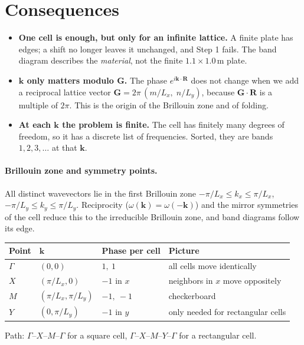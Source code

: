 \section{Consequences}

\begin{itemize}
  \item \textbf{One cell is enough, but only for an infinite lattice.} A finite
        plate has edges; a shift no longer leaves it unchanged, and Step 1
        fails. The band diagram describes the \emph{material}, not the finite
        $1.1 \times 1.0\,\mathrm{m}$ plate.
  \item \textbf{$\mathbf{k}$ only matters modulo $\mathbf{G}$.} The phase
        $e^{i\mathbf{k}\cdot\mathbf{R}}$ does not change when we add a
        reciprocal lattice vector
        $\mathbf{G} = 2\pi\,(m/L_x,\; n/L_y)$, because
        $\mathbf{G}\cdot\mathbf{R}$ is a multiple of $2\pi$. This is the origin
        of the Brillouin zone and of folding.
  \item \textbf{At each $\mathbf{k}$ the problem is finite.} The cell has
        finitely many degrees of freedom, so it has a discrete list of
        frequencies. Sorted, they are bands $1, 2, 3, \dots$ at that
        $\mathbf{k}$.
\end{itemize}

\paragraph{Brillouin zone and symmetry points.}
All distinct wavevectors lie in the first Brillouin zone
$-\pi/L_x \le k_x \le \pi/L_x$, $-\pi/L_y \le k_y \le \pi/L_y$. Reciprocity
($\omega(\mathbf{k}) = \omega(-\mathbf{k})$) and the mirror symmetries of the
cell reduce this to the irreducible Brillouin zone, and band diagrams follow its
edge.

\begin{center}
\begin{tabular}{|l|l|l|l|}
\hline
Point & $\mathbf{k}$ & Phase per cell & Picture \\
\hline
$\Gamma$ & $(0,0)$ & $1,\ 1$ & all cells move identically \\
$X$ & $(\pi/L_x, 0)$ & $-1$ in $x$ & neighbors in $x$ move oppositely \\
$M$ & $(\pi/L_x, \pi/L_y)$ & $-1,\ -1$ & checkerboard \\
$Y$ & $(0, \pi/L_y)$ & $-1$ in $y$ & only needed for rectangular cells \\
\hline
\end{tabular}
\end{center}
Path: $\Gamma$--$X$--$M$--$\Gamma$ for a square cell,
$\Gamma$--$X$--$M$--$Y$--$\Gamma$ for a rectangular cell.

